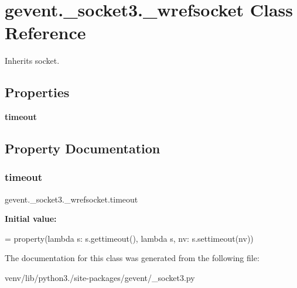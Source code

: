 \hypertarget{classgevent_1_1__socket3_1_1__wrefsocket}{}\section{gevent.\+\_\+socket3.\+\_\+wrefsocket Class Reference}
\label{classgevent_1_1__socket3_1_1__wrefsocket}


Inherits socket.

\subsection*{Properties}
\begin{DoxyCompactItemize}
\item 
{\bfseries timeout}
\end{DoxyCompactItemize}


\subsection{Property Documentation}
\mbox{\label{classgevent_1_1__socket3_1_1__wrefsocket_a2da618b8ea5dd018cdd53c73c001d8a9}} 
\subsubsection{\texorpdfstring{timeout}{timeout}}
{\footnotesize\ttfamily gevent.\+\_\+socket3.\+\_\+wrefsocket.\+timeout\hspace{0.3cm}{\ttfamily [static]}}

{\bfseries Initial value\+:}
\begin{DoxyCode}
=  property(\textcolor{keyword}{lambda} s: s.gettimeout(),
                           \textcolor{keyword}{lambda} s, nv: s.settimeout(nv))
\end{DoxyCode}


The documentation for this class was generated from the following file\+:\begin{DoxyCompactItemize}
\item 
venv/lib/python3./site-\/packages/gevent/\+\_\+socket3.\+py\end{DoxyCompactItemize}
